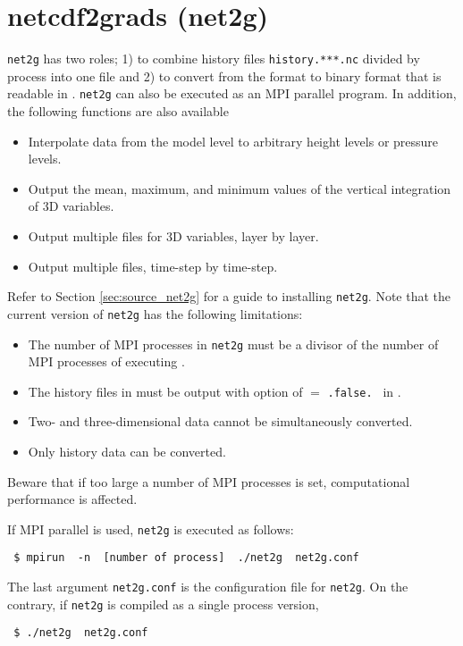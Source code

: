 \section{netcdf2grads (net2g)} \label{sec:net2g}

\verb|net2g| has two roles; 1) to combine history files \verb|history.***.nc| divided by process into one file
and 2) to convert from the \netcdf format to binary format that is readable in \grads.
\verb|net2g| can also be executed as an MPI parallel program.
%
In addition, the following functions are also available
\begin{itemize}
 \item Interpolate data from the model level to arbitrary height levels or pressure levels.
 \item Output the mean, maximum, and minimum values of the vertical integration of 3D variables.
 \item Output multiple files for 3D variables, layer by layer.
 \item Output multiple files, time-step by time-step.
\end{itemize}


Refer to Section \ref{sec:source_net2g} for a guide to installing \verb|net2g|.
Note that the current version of \verb|net2g| has the following limitations:
\begin{itemize}
 \item The number of MPI processes in \verb|net2g| must be a divisor of the number of MPI processes of executing \scalerm.
 \item The history files in \scalerm must be output with option of  $=$ \verb|.false. | in .
 \item Two- and three-dimensional data cannot be simultaneously converted.
 \item Only history data can be converted.
\end{itemize}
Beware that if too large a number of MPI processes is set,
computational performance is affected.


If MPI parallel is used, \verb|net2g| is executed as follows:
\begin{verbatim}
 $ mpirun  -n  [number of process]  ./net2g  net2g.conf
\end{verbatim}
The last argument \verb|net2g.conf| is the configuration file for \verb|net2g|.
On the contrary, if \verb|net2g| is compiled as a single process version,
\begin{verbatim}
 $ ./net2g  net2g.conf
\end{verbatim}

